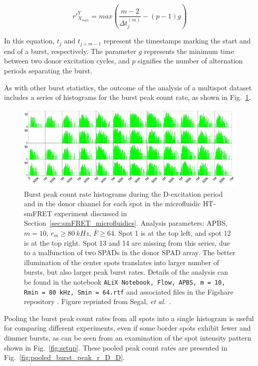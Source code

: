 \begin{equation}
\label{eqn:peak_count_rate'}
r'^{Y}_{X_{max}} = max\left(\frac{m-2}{\Delta t^{(m)}_{j}} - (p -1)g\right)
\end{equation}

In this equation, $t_j$ and $t_{j+m-1}$ represent the timestamps marking the start and end of a burst, respectively. 
The parameter $g$ represents the minimum time between two donor excitation cycles, and $p$ signifies the number of alternation periods separating the burst.

As with other burst statistics, the outcome of the analysis of a multispot dataset includes a series of histograms for the burst peak count rate, as shown in Fig.~\ref{fig:flow_burst_peak_r_D_D_48_spots}.

\begin{figure}
\centering
\includegraphics[width=\textwidth]{chapters/figures/flow_burst_peak_r_D_D_48_spots.jpg}
\caption{\label{fig:flow_burst_peak_r_D_D_48_spots}
Burst peak count rate histograms during the D-excitation period and in the donor channel for each spot in the microfluidic \ac{HT-smFRET} experiment discussed in Section~\ref{sec:smFRET_microfluidics}.
Analysis parameters: \ac{APBS}, $m = 10$, $r_m \geq 80~kHz$,
$\overline{F} \geq 64$. 
Spot 1 is at the top left, and spot 12 is at the top right. Spot 13 and 14 are missing from this series, due to a malfunction of two SPADs in the donor SPAD array. 
The better illumination of the center spots translates into larger number of bursts, but also larger peak burst rates.
Details of the analysis can be found in the notebook \texttt{ALiX Notebook, Flow, \ac{APBS}, m = 10, Rmin = 80 kHz, Smin = 64.rtf} and associated files in the Figshare repository \cite{figshare_repo_2019}.
Figure reprinted from Segal, \textit{et al.}~\cite{segal_methods_2019}.
}
\end{figure}

Pooling the burst peak count rates from all spots into a single histogram is useful for comparing different experiments, even if some border spots exhibit fewer and dimmer bursts, as can be seen from an examination of the spot intensity pattern shown in Fig.~\ref{fig:setup}. 
These pooled peak count rates are presented in Fig.~\ref{fig:pooled_burst_peak_r_D_D}.

